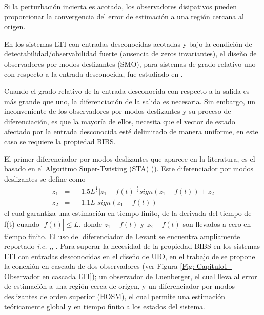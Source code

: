 \documentclass[11pt,letterpaper,twoside,openright]{report}
\begin{document}
	Si la perturbación incierta es acotada, los observadores disipativos pueden proporcionar la convergencia del error de estimación a una región cercana al origen.
	
	En los sistemas LTI con entradas desconocidas acotadas y bajo la condición de detectabilidad/observabilidad fuerte (ausencia de zeros invariantes), el diseño de observadores por modos deslizantes (SMO), para sistemas de grado relativo uno con respecto a la entrada desconocida, fue estudiado en \cite{WalcottZak}.
	
	Cuando el grado relativo de la entrada desconocida con respecto a la salida es más grande que uno, la diferenciación de la salida es necesaria. Sin embargo, un inconveniente de los observadores por modos deslizantes y su proceso de diferenciación, es que la mayoría de ellos, necesita que el vector de  estado afectado por la entrada desconocida esté delimitado de manera uniforme, en este caso se requiere la propiedad BIBS. 
	
	El primer diferenciador por modos deslizantes que aparece en la literatura, es el basado en el Algoritmo Super-Twisting (STA) (\cite{Levant1998}). Este diferenciador por modos deslizantes se define como 
	\begin{eqnarray}
	\dot{z}_1&=&-1.5L^{\frac{1}{2}}|z_1 -f(t)|^{\frac{1}{2}}sign(z_1 -f(t))+z_2\\
	\nonumber \dot{z}_2&=&-1.1L\; sign(z_1 -f(t))
	\end{eqnarray}
	el cual  garantiza una estimación en tiempo finito, de la derivada del tiempo de f(t) cuando $|\dot{f}(t)|\leq L$, donde $z_1-f(t)$ y $z_2-\dot{f}(t)$ son llevados a cero en tiempo finito. El uso del diferenciador de Levant se encuentra ampliamente reportado \textit{i.e.} \cite{Davila2005},\cite{Davila2006}, \cite{Bejarano2007}.
	\newpage
	Para superar la necesidad de la propiedad BIBS en los  sistemas LTI con  entradas desconocidas en el diseño de UIO, en el trabajo de \cite{Fridman2007} se propone la conexión en cascada de dos observadores (ver Figura \ref{Fig: Capitulo1 - Observador en cascada LTI}); un observador de Luenberger, el cual lleva al error de estimación a una región cerca de origen, y un diferenciador por modos deslizantes de orden superior (HOSM), el cual permite una estimación teóricamente global y en tiempo finito a los estados del sistema. 
	
\end{document}
